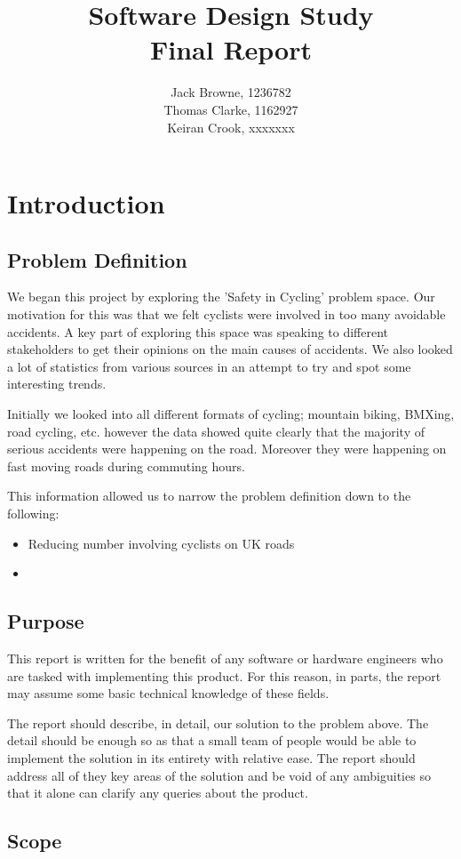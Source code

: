 \documentclass[]{report}
\title{Software Design Study\\Final Report}
\author{Jack Browne, 1236782\\Thomas Clarke, 1162927\\Keiran Crook, xxxxxxx}
\begin{document}
\maketitle

\tableofcontents

\chapter{Introduction}
\section{Problem Definition}
We began this project by exploring the 'Safety in Cycling' problem space. Our motivation for this was that we felt cyclists were involved in too many avoidable accidents. 
A key part of exploring this space was speaking to different stakeholders to get their opinions on the main causes of accidents. We also looked a lot of statistics from various sources in an attempt to try and spot some interesting trends.

Initially we looked into all different formats of cycling; mountain biking, BMXing, road cycling, etc. however the data showed quite clearly that the majority of serious accidents were happening on the road. Moreover they were happening on fast moving roads during commuting hours.

This information allowed us to narrow the problem definition down to the following:
\begin{itemize}
  \item Reducing number involving cyclists on UK roads
  \item 
\end{itemize}
\section{Purpose}
This report is written for the benefit of any software or hardware engineers who are tasked with implementing this product. For this reason, in parts, the report may assume some basic technical knowledge of these fields. 

The report should describe, in detail, our solution to the problem above. The detail should be enough so as that a small team of people would be able to implement the solution in its entirety with relative ease. The report should address all of they key areas of the solution and be void of any ambiguities so that it alone can clarify any queries about the product.
\section{Scope}
\end{document}
